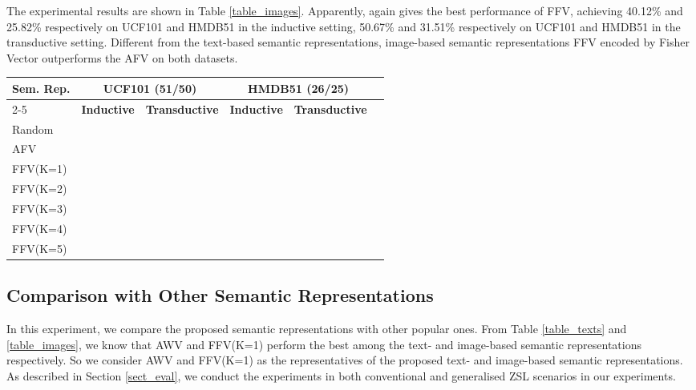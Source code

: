 \documentclass[runningheads,a4paper] {llncs}
\begin{document}
The experimental results are shown in Table \ref{table_images}. Apparently,  again gives the best performance of FFV, achieving 40.12\% and 25.82\% respectively on UCF101 and HMDB51 in the inductive setting, 50.67\% and 31.51\% respectively on UCF101 and HMDB51 in the transductive setting. Different from the text-based semantic representations, image-based semantic representations FFV encoded by Fisher Vector outperforms the AFV on both datasets.


\begin{table*}[t]
{\normalsize
\centering
\caption[]{Results of different image-based semantic representations (meanstandard error of recognition accuracy \%) on UCF101 and HMDB51 datasets.
}
\label{table_images}

\begin{lrbox}{\tablebox}
\begin{tabular}{@{}lccccc}\toprule
  \multirow{2}{*}{\textbf{Sem. Rep.}} & \multicolumn{2}{c}{\textbf{UCF101 (51/50)}} & \multicolumn{2}{c}{\textbf{HMDB51 (26/25)} }\\
  \cmidrule(l){2-5}
  & \textbf{Inductive} & \textbf{Transductive} & \textbf{Inductive} & \textbf{Transductive}  \\ \midrule
Random  & 		   &           &           &  \\
AFV 	 &  &  &  &  \\
FFV(K=1) &  &  &  &  \\
FFV(K=2) &  &  &  &  \\
FFV(K=3) &  &  &  &  \\
FFV(K=4) &  &  &  &  \\
FFV(K=5) &  &  &  &  \\
\bottomrule
\end{tabular}
\end{lrbox}
\scalebox{0.8}{\usebox{\tablebox}}
}
\end{table*}

\subsection{Comparison with Other Semantic Representations}
In this experiment, we compare the proposed semantic representations with other popular ones. From Table \ref{table_texts} and \ref{table_images}, we know that AWV and FFV(K=1) perform the best among the text- and image-based semantic representations respectively. So we consider AWV and FFV(K=1) as the representatives of the proposed text- and image-based semantic representations. As described in Section \ref{sect_eval}, we conduct the experiments in both conventional and generalised ZSL scenarios in our experiments.
\end{document}
